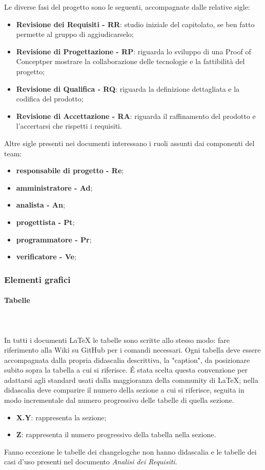 		Le diverse fasi del progetto sono le seguenti, accompagnate dalle relative sigle:
		\begin{itemize}
			\item \textbf{Revisione dei Requisiti - RR}: studio iniziale del capitolato\glo, se ben fatto permette al gruppo di aggiudicarselo;
			\item \textbf{Revisione di Progettazione - RP}: riguarda lo sviluppo di una Proof of Concept\glosp per mostrare la collaborazione delle tecnologie e la fattibilità del progetto;
			\item \textbf{Revisione di Qualifica - RQ}: riguarda la definizione dettagliata e la codifica del prodotto;
			\item \textbf{Revisione di Accettazione - RA}: riguarda il raffinamento del prodotto e l'accertarsi che rispetti i requisiti.	
		\end{itemize}	
		Altre sigle presenti nei documenti interessano i ruoli assunti dai componenti del team:
		\begin{itemize}
			\item \textbf{responsabile di progetto - Re};
			\item \textbf{amministratore - Ad};
			\item \textbf{analista - An};
			\item \textbf{progettista - Pt};
			\item \textbf{programmatore - Pr};
			\item \textbf{verificatore - Ve};
		\end{itemize}
		\subsubsection{Elementi grafici}
		\paragraph{Tabelle} \mbox{}\\ \mbox{}\\
		In tutti i documenti \LaTeX{} le tabelle sono scritte allo stesso modo: fare riferimento alla Wiki su GitHub per i comandi necessari.\newline 
		Ogni tabella deve essere accompagnata dalla propria didascalia descrittiva, la "caption", da posizionare subito sopra la tabella a cui si riferisce. \'E stata scelta questa convenzione per adattarsi agli standard usati dalla maggioranza della community di \LaTeX{}; nella didascalia deve comparire il numero della sezione a cui si riferisce, seguita in modo incrementale dal numero progressivo delle tabelle di quella sezione.
		\begin{itemize}
			\item \textbf{{X.Y}}: rappresenta la sezione;
			\item \textbf{{Z}}: rappresenta il numero progressivo della tabella nella sezione.
		\end{itemize}
		Fanno eccezione le tabelle dei changelog\glosp che non hanno didascalia e le tabelle dei casi d'uso presenti nel documento \textit{Analisi dei Requisiti}.
